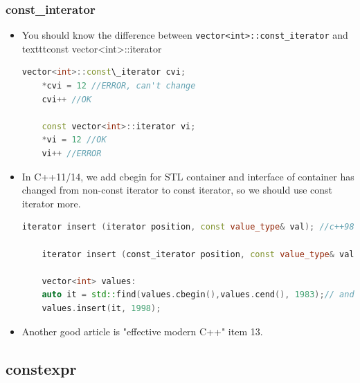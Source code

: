 \documentclass[a4paper,11pt,twoside]{book}
\begin{document}
\subsubsection{const\_interator}
\begin{itemize}
	\item You should know the difference between \texttt{vector<int>::const\_iterator} and texttt{const vector<int>::iterator}
	\begin{lstlisting}[frame=single, language=c++]
	vector<int>::const\_iterator cvi;
	*cvi = 12 //ERROR, can't change
	cvi++ //OK
	
	const vector<int>::iterator vi;
	*vi = 12 //OK
	vi++ //ERROR
	\end{lstlisting}
	
	\item In C++11/14, we add cbegin for STL container and interface of container has changed from non-const iterator to const iterator, so we should use const iterator more. 
	\begin{lstlisting}[frame=single, language=c++]
	iterator insert (iterator position, const value_type& val); //c++98
	
	iterator insert (const_iterator position, const value_type& val);//c++11
	
	vector<int> values:
	auto it = std::find(values.cbegin(),values.cend(), 1983);// and cend
	values.insert(it, 1998);
	\end{lstlisting}
	
	
	\item Another good article is "effective modern C++" item 13. 
\end{itemize}

\subsection{constexpr}
\end{document}
